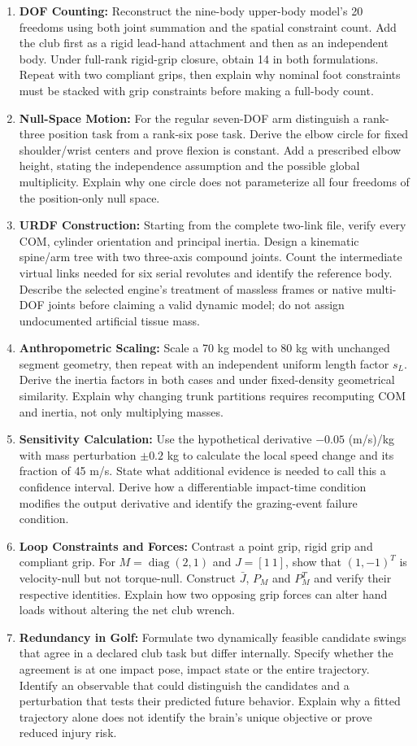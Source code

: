 \begin{enumerate}
\item \textbf{DOF Counting:} Reconstruct the nine-body upper-body model's 20 freedoms using both joint summation and the spatial constraint count. Add the club first as a rigid lead-hand attachment and then as an independent body. Under full-rank rigid-grip closure, obtain 14 in both formulations. Repeat with two compliant grips, then explain why nominal foot constraints must be stacked with grip constraints before making a full-body count.
\item \textbf{Null-Space Motion:} For the regular seven-DOF arm distinguish a rank-three position task from a rank-six pose task. Derive the elbow circle for fixed shoulder/wrist centers and prove flexion is constant. Add a prescribed elbow height, stating the independence assumption and the possible global multiplicity. Explain why one circle does not parameterize all four freedoms of the position-only null space.
\item \textbf{URDF Construction:} Starting from the complete two-link file, verify every COM, cylinder orientation and principal inertia. Design a kinematic spine/arm tree with two three-axis compound joints. Count the intermediate virtual links needed for six serial revolutes and identify the reference body. Describe the selected engine's treatment of massless frames or native multi-DOF joints before claiming a valid dynamic model; do not assign undocumented artificial tissue mass.
\item \textbf{Anthropometric Scaling:} Scale a 70 kg model to 80 kg with unchanged segment geometry, then repeat with an independent uniform length factor $s_L$. Derive the inertia factors in both cases and under fixed-density geometrical similarity. Explain why changing trunk partitions requires recomputing COM and inertia, not only multiplying masses.
\item \textbf{Sensitivity Calculation:} Use the hypothetical derivative $-0.05$ (m/s)/kg with mass perturbation $\pm0.2$ kg to calculate the local speed change and its fraction of 45 m/s. State what additional evidence is needed to call this a confidence interval. Derive how a differentiable impact-time condition modifies the output derivative and identify the grazing-event failure condition.
\item \textbf{Loop Constraints and Forces:} Contrast a point grip, rigid grip and compliant grip. For $M=\operatorname{diag}(2,1)$ and $J=[1\ 1]$, show that $(1,-1)^T$ is velocity-null but not torque-null. Construct $\bar J$, $P_M$ and $P_M^T$ and verify their respective identities. Explain how two opposing grip forces can alter hand loads without altering the net club wrench.
\item \textbf{Redundancy in Golf:} Formulate two dynamically feasible candidate swings that agree in a declared club task but differ internally. Specify whether the agreement is at one impact pose, impact state or the entire trajectory. Identify an observable that could distinguish the candidates and a perturbation that tests their predicted future behavior. Explain why a fitted trajectory alone does not identify the brain's unique objective or prove reduced injury risk.
\end{enumerate}
